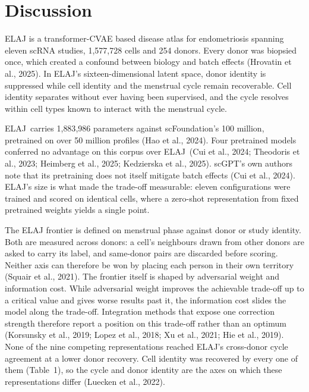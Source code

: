 \documentclass[11pt]{article}
\newcommand{\elaj}{ELAJ\xspace}
\begin{document}
\section*{Discussion}

\elaj is a transformer-CVAE based disease atlas for endometriosis spanning 
eleven scRNA studies, 1{,}577{,}728 cells and 254 donors. Every donor was 
biopsied once, which created a confound between biology and batch effects 
(Hrovatin et al., 2025). In \elaj's sixteen-dimensional latent space,
donor identity is suppressed while cell identity and the menstrual cycle
remain recoverable. Cell identity separates without ever having been
supervised, and the cycle resolves within cell types known to interact 
with the menstrual cycle.

\elaj\ carries 1{,}883{,}986 parameters against scFoundation's 100 million, 
pretrained on over 50 million profiles (Hao et al., 2024). Four 
pretrained models conferred no advantage on this corpus over \elaj\
(Cui et al., 2024; Theodoris et al., 2023; Heimberg et al., 2025; Kedzierska et al., 2025).
scGPT's own authors note that its pretraining does not itself mitigate 
batch effects (Cui et al., 2024). \elaj's size is what made the trade-off
measurable: eleven configurations were trained and scored on identical cells,
where a zero-shot representation from fixed pretrained weights yields a 
single point.

The \elaj frontier is defined on menstrual phase against donor or study
identity. Both are measured across donors: a cell's neighbours drawn from
other donors are asked to carry its label, and same-donor pairs are discarded
before scoring. Neither axis can therefore be won by placing each person in
their own territory (Squair et al., 2021). The frontier itself is
shaped by adversarial weight and information cost. While adversarial weight 
improves the achievable trade-off up to a critical value and gives worse results 
past it, the information cost slides the model along the trade-off. Integration
methods that expose one correction strength therefore report a position on
this trade-off rather than an optimum
(Korsunsky et al., 2019; Lopez et al., 2018; Xu et al., 2021; Hie et al., 2019).
None of the nine competing representations reached \elaj's cross-donor cycle
agreement at a lower donor recovery. Cell identity was recovered by every one
of them (Table~1), so the cycle and donor identity are the axes on which these 
representations differ (Luecken et al., 2022).
\end{document}
